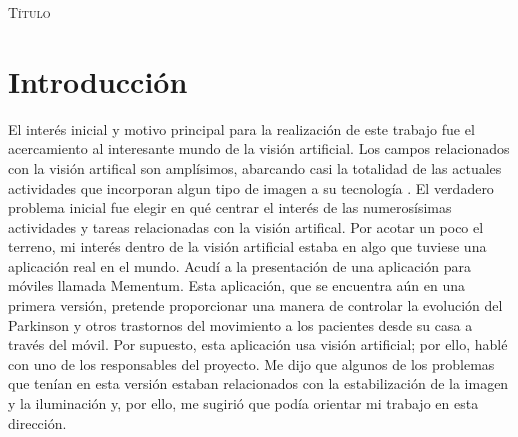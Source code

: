 \documentclass[a4paper,openright, 12pt]{book}
\begin{document}
\begin{titlepage}
\begin{center}
\begin{Huge}
\textsc{Título}
\end{Huge}
\end{center}
\end{titlepage}

\newpage
\mbox{}
\thispagestyle{empty} 


\tableofcontents %
\newpage
\thispagestyle{empty}


\chapter{Introducción}\label{cap.introduccion}

El interés inicial y motivo principal para la realización de este trabajo fue el acercamiento al interesante mundo de la visión artificial. Los campos relacionados con la visión artifical son amplísimos, abarcando casi la totalidad de las actuales actividades que incorporan algun tipo de imagen a su tecnología . El verdadero problema inicial fue elegir en qué centrar el interés de las numerosísimas actividades y tareas relacionadas con la visión artifical. Por acotar un poco el terreno, mi interés dentro de la visión artificial estaba en algo que tuviese una aplicación real en el mundo. Acudí a la presentación de una aplicación para móviles llamada Mementum. Esta aplicación, que se encuentra aún en una primera versión, pretende proporcionar una manera de controlar la evolución del Parkinson y otros trastornos del movimiento a los pacientes desde su casa a través del móvil. Por supuesto, esta aplicación usa visión artificial; por ello, hablé con uno de los responsables del proyecto. Me dijo que algunos de los problemas que tenían en esta versión estaban relacionados con la estabilización de la imagen y la iluminación y, por ello, me sugirió que podía orientar mi trabajo en esta dirección.
\end{document}
